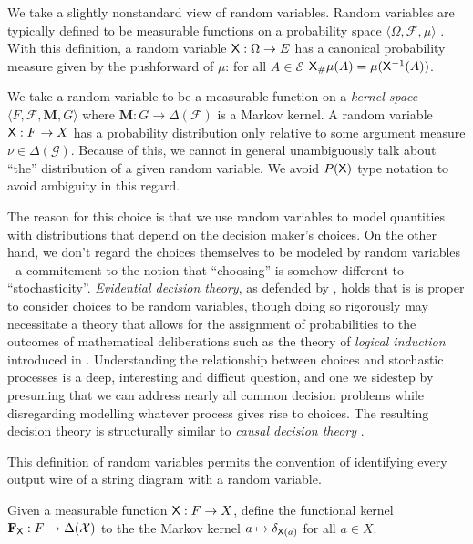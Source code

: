 We take a slightly nonstandard view of random variables. Random variables are typically defined to be measurable functions on a probability space $\langle \Omega, \mathcal{F}, \mu\rangle$ \citep{cinlar_probability_2011}. With this definition, a random variable $\mathsf{X}:\Omega\to E$ has a canonical probability measure given by the pushforward of $\mu$: for all $A\in\mathscr{E}$ $\mathsf{X}_\# \mu(A) = \mu(\mathsf{X}^{-1}(A))$.

We take a random variable to be a measurable function on a \emph{kernel space} $\langle F,\mathcal{F},\mathbf{M}, G\rangle$ where $\mathbf{M}:G\to \Delta(\mathcal{F})$ is a Markov kernel. A random variable $\mathsf{X}:F\to X$ has a probability distribution only relative to some argument measure $\nu\in\Delta(\mathcal{G})$. Because of this, we cannot in general unambiguously talk about ``the'' distribution of a given random variable. We avoid $P(\mathsf{X})$ type notation to avoid ambiguity in this regard. 

The reason for this choice is that we use random variables to model quantities with distributions that depend on the decision maker's choices. On the other hand, we don't regard the choices themselves to be modeled by random variables - a commitement to the notion that ``choosing'' is somehow different to ``stochasticity''. \emph{Evidential decision theory}, as defended by \citet{jeffrey_logic_1981}, holds that is is proper to consider choices to be random variables, though doing so rigorously may necessitate a theory that allows for the assignment of probabilities to the outcomes of mathematical deliberations such as the theory of \emph{logical induction} introduced in \citet{garrabrant_logical_2017}. Understanding the relationship between choices and stochastic processes is a deep, interesting and difficut question, and one we sidestep by presuming that we can address nearly all common decision problems while disregarding modelling whatever process gives rise to choices. The resulting decision theory is structurally similar to \emph{causal decision theory} \citep{lewis_causal_1981}.

This definition of random variables permits the convention of identifying every output wire of a string diagram with a random variable. 

\begin{definition}
Given a measurable function $\mathsf{X}:F\to X$, define the functional kernel $\mathbf{F}_{\mathsf{X}}:F\to \Delta(\mathcal{X})$ to the the Markov kernel $a\mapsto \delta_{\mathsf{X}(a)}$ for all $a\in X$.
\end{definition}

